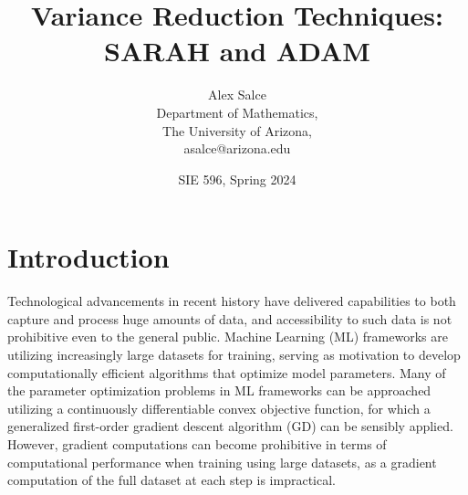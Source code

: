 \documentclass[letterpaper,11 pt]{article}
\providecommand{\keywords}[1]{\textbf{\textit{keywords:}} #1}
\begin{document}
\allowdisplaybreaks
\title{Variance Reduction Techniques: SARAH and ADAM}


\author{Alex Salce\\{\small Department of Mathematics,} \\ {\small The University of Arizona,} \\ {\small asalce@arizona.edu}}

\date{SIE 596, Spring 2024}


\maketitle
\begin{abstract}

\end{abstract}
\section{Introduction}
\label{intro}
Technological advancements in recent history have delivered capabilities to both capture and process huge amounts of data, and accessibility to such data is not prohibitive even to the general public.  Machine Learning (ML) frameworks are utilizing increasingly large datasets for training, serving as motivation to develop computationally efficient algorithms that optimize model parameters.  Many of the parameter optimization problems in ML frameworks can be approached utilizing a continuously differentiable convex objective function, for which a generalized first-order gradient descent algorithm (GD) can be sensibly applied. However, gradient computations can become prohibitive in terms of computational performance when training using large datasets, as a gradient computation of the full dataset at each step is impractical. 
\end{document}
